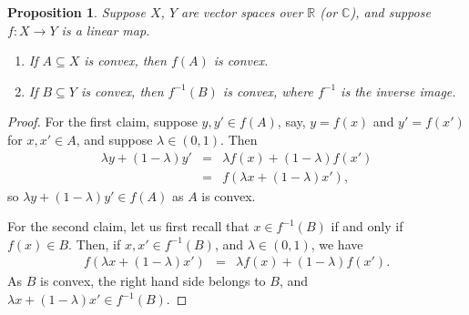 \documentclass[12pt]{article}
\newcommand{\sR}[0]{\mathbb{R}}
\newcommand{\sC}[0]{\mathbb{C}}
\newtheorem{prop}{Proposition}
\begin{document}
\begin{prop}
Suppose $X$, $Y$ are vector spaces over $\sR$ (or $\sC$),
    and suppose $f\colon X\to Y$ is a linear map.
\begin{enumerate}
\item  If $A\subseteq X$ is convex, then $f(A)$ is convex.
\item  If $B\subseteq Y$ is convex, then $f^{-1}(B)$ is convex,
where $f^{-1}$ is the inverse image. 
\end{enumerate}
\end{prop}

\begin{proof} For the first claim, 
suppose $y,y'\in f(A)$, say,
$y=f(x)$ and $y'=f(x')$ for $x,x'\in A$, and suppose $\lambda\in (0,1)$.
Then 
\begin{eqnarray*}
  \lambda y + (1-\lambda)y' &=& \lambda f(x) + (1-\lambda ) f(x') \\
    &=& f( \lambda x + (1-\lambda) x'),
\end{eqnarray*}
so  $\lambda y + (1-\lambda)y' \in f(A)$ as $A$ is convex.

For the second claim, let us first recall that $x\in f^{-1}(B)$
if and only if $f(x)\in B$. Then, if $x,x'\in f^{-1}(B)$, 
and $\lambda\in (0,1)$, we have
\begin{eqnarray*}
f(\lambda x + (1-\lambda)x') &=& \lambda f(x) + (1-\lambda ) f(x').
\end{eqnarray*}
As $B$ is convex, the right hand side belongs to $B$, 
and $\lambda x + (1-\lambda)x' \in f^{-1}(B)$. 
\end{proof}
\end{document}
